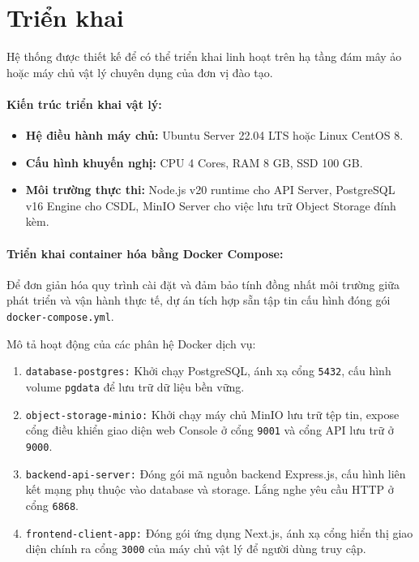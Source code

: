 \documentclass[../DoAn.tex]{subfiles}
\begin{document}
\section{Triển khai}
Hệ thống được thiết kế để có thể triển khai linh hoạt trên hạ tầng đám mây ảo hoặc máy chủ vật lý chuyên dụng của đơn vị đào tạo.

\paragraph{Kiến trúc triển khai vật lý:}
\begin{itemize}
    \item \textbf{Hệ điều hành máy chủ:} Ubuntu Server 22.04 LTS hoặc Linux CentOS 8.
    \item \textbf{Cấu hình khuyến nghị:} CPU 4 Cores, RAM 8 GB, SSD 100 GB.
    \item \textbf{Môi trường thực thi:} Node.js v20 runtime cho API Server, PostgreSQL v16 Engine cho CSDL, MinIO Server cho việc lưu trữ Object Storage đính kèm.
\end{itemize}

\paragraph{Triển khai container hóa bằng Docker Compose:}
Để đơn giản hóa quy trình cài đặt và đảm bảo tính đồng nhất môi trường giữa phát triển và vận hành thực tế, dự án tích hợp sẵn tập tin cấu hình đóng gói \texttt{docker-compose.yml}.

Mô tả hoạt động của các phân hệ Docker dịch vụ:
\begin{enumerate}
    \item \texttt{database-postgres:} Khởi chạy PostgreSQL, ánh xạ cổng \texttt{5432}, cấu hình volume \texttt{pgdata} để lưu trữ dữ liệu bền vững.
    \item \texttt{object-storage-minio:} Khởi chạy máy chủ MinIO lưu trữ tệp tin, expose cổng điều khiển giao diện web Console ở cổng \texttt{9001} và cổng API lưu trữ ở \texttt{9000}.
    \item \texttt{backend-api-server:} Đóng gói mã nguồn backend Express.js, cấu hình liên kết mạng phụ thuộc vào database và storage. Lắng nghe yêu cầu HTTP ở cổng \texttt{6868}.
    \item \texttt{frontend-client-app:} Đóng gói ứng dụng Next.js, ánh xạ cổng hiển thị giao diện chính ra cổng \texttt{3000} của máy chủ vật lý để người dùng truy cập.
\end{enumerate}
\end{document}
